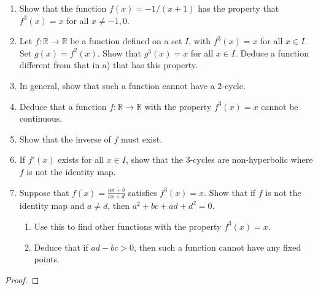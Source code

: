 \begin{problem}{7}
  \begin{enumerate}
    \item Show that the function $f(x) = -1/(x+1)$ has the property that $f^3(x) = x$
      for all $x\neq-1,0$.
    \item Let $f:\mathbb{R} \to \mathbb{R}$ be a function
      defined on a set $I$, with $f^3(x) = x$ for all $x\in I$. Set $g(x) = f^2(x)$.
      Show that $g^3(x) = x$ for all $x\in I$. Deduce a function different from that
      in a) that has this property.
    \item In general, show that such a function cannot have a 2-cycle.
    \item Deduce that a function $f:\mathbb{R}\to\mathbb{R}$ with the property $f^3(x) = x$
      cannot be continuous.
    \item Show that the inverse of $f$ must exist.
    \item If $f'(x)$ exists for all $x\in I$, show that the 3-cycles are non-hyperbolic where $f$ is not the identity map.
    \item Suppose that $\displaystyle f(x) = \frac{ax + b}{cx + d}$ satisfies $f^3(x) = x$. Show that if $f$ is not the identity map
      and $a\neq d$, then $a^2 +bc + ad +d^2 = 0$.
      \begin{enumerate}[label=\roman*)]
        \item Use this to find other functions with the property $f^3(x) = x$.
        \item Deduce that if $ad- bc > 0$, then such a function cannot have any fixed points.
      \end{enumerate}
  \end{enumerate}
\end{problem}

\begin{proof}
\end{proof}
\newpage

